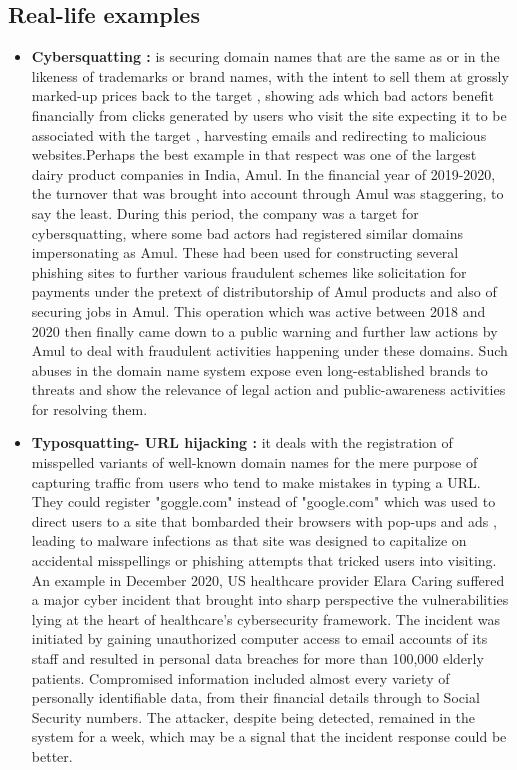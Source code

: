 \subsection{Real-life examples}

\begin{itemize}
    \item \textbf{Cybersquatting :} is securing domain names that are the same as or in the likeness of trademarks or brand names, with the intent to sell them at grossly marked-up prices back to the target , showing ads which bad actors benefit financially from clicks generated by users who visit the site expecting it to be associated with the target , harvesting emails and redirecting to malicious websites.Perhaps the best example in that respect was one of the largest dairy product companies in India, Amul. In the financial year of 2019-2020, the turnover that was brought into account through Amul was staggering, to say the least. During this period, the company was a target for cybersquatting, where some bad actors had registered similar domains impersonating as Amul. These had been used for constructing several phishing sites to further various fraudulent schemes like solicitation for payments under the pretext of distributorship of Amul products and also of securing jobs in Amul. This operation which was active between 2018 and 2020 then finally came down to a public warning and further law actions by Amul to deal with fraudulent activities happening under these domains. Such abuses in the domain name system expose even long-established brands to threats and show the relevance of legal action and public-awareness activities for resolving them. \cite{MehtaCybersquatting}
    
    \item \textbf{Typosquatting- URL hijacking :} it deals with the registration of misspelled variants of well-known domain names for the mere purpose of capturing traffic from users who tend to make mistakes in typing a URL. They could register "goggle.com" instead of "google.com" which was used to direct users to a site that bombarded their browsers with pop-ups and ads , leading to malware infections as that site was designed to capitalize on accidental misspellings or phishing  attempts that tricked users into visiting. \cite{SplunkTyposquatting} An example in December 2020, US healthcare provider Elara Caring suffered a major cyber incident that brought into sharp perspective the vulnerabilities lying at the heart of healthcare's cybersecurity framework. The incident was initiated by gaining unauthorized computer access to email accounts of its staff and resulted in personal data breaches for more than 100,000 elderly patients. Compromised information included almost every variety of personally identifiable data, from their financial details through to Social Security numbers. The attacker, despite being detected, remained in the system for a week, which may be a signal that the incident response could be better. \cite{PandaSecurityPhishing}
    

\end{itemize}
